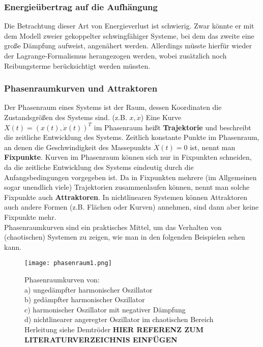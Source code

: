 \subsubsection{Energieübertrag auf die Aufhängung}

Die Betrachtung dieser Art von Energieverlust ist schwierig. Zwar könnte er mit dem Modell zweier gekoppelter schwingfähiger Systeme, bei dem das zweite eine große Dämpfung aufweist, angenähert werden. Allerdings müsste hierfür wieder der Lagrange-Formalismus herangezogen werden, wobei zusätzlich noch Reibungsterme berücksichtigt werden müssten. 



\subsubsection{Phasenraumkurven und Attraktoren}
Der Phasenraum eines Systems ist der Raum, dessen Koordinaten die Zustandsgrößen des Systems sind. (z.B. $x, \dot{x}$) Eine Kurve $X(t) = (x(t), \dot{x}(t))^T$ im Phasenraum heißt \textbf{Trajektorie} und beschreibt die zeitliche Entwicklung des Systems. Zeitlich konstante Punkte im Phasenraum, an denen die Geschwindigkeit des Massepunkts $\dot{X}(t) = 0$  ist, nennt man \textbf{Fixpunkte}. Kurven im Phasenraum können sich nur in Fixpunkten schneiden, da die zeitliche Entwicklung des Systems eindeutig durch die Anfangsbedingungen vorgegeben ist. Da in Fixpunkten mehrere (im Allgemeinen sogar unendlich viele) Trajektorien zusammenlaufen können, nennt man solche Fixpunkte auch \textbf{Attraktoren}. In nichtlinearen Systemen können Attraktoren auch andere Formen (z.B. Flächen oder Kurven) annehmen, sind dann aber keine Fixpunkte mehr.
\\
Phasenraumkurven sind ein praktisches Mittel, um das Verhalten von (chaotischen) Systemen zu zeigen, wie man in den folgenden Beispielen sehen kann.

\begin{figure}
\texttt{[image: phasenraum1.png]}
\caption{Phasenraumkurven von: \\a) ungedämpfter harmonischer Oszillator \\b) gedämpfter harmonischer Oszillator \\c) harmonischer Oszillator mit negativer Dämpfung \\d) nichtlinearer angeregter Oszillator im chaotischen Bereich \\Herleitung siehe Demtröder \textbf{HIER REFERENZ ZUM LITERATURVERZEICHNIS EINFÜGEN}}
\end{figure}

